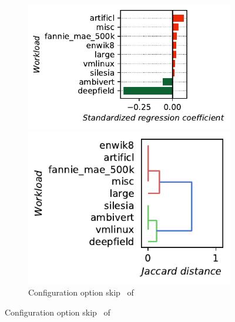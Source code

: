 \begin{figure}
	\begin{subfigure}{0.99\linewidth}
		\begin{minipage}{0.5\linewidth}
			\includegraphics[width=\linewidth]{images/plots/kanzi_skip_influences.pdf}
		\end{minipage}
		\begin{minipage}{0.5\linewidth}
			\includegraphics[width=\linewidth]{images/plots/kanzi_skip_workloads.pdf}
		\end{minipage}
		\caption{Configuration option \guillemotleft\textsf{skip}\guillemotright~ of \kanzi}
		\label{fig:results_rq3_kanzi}
	\end{subfigure}
	

\end{figure}
